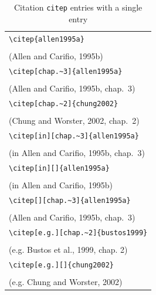 ﻿\documentclass{article}
\begin{document}
\begin{table}
\begin{center}
\begin{tabular}{l}
    \verb#\citep{allen1995a}# \\
    \citep{allen1995a} \\
    (Allen and Carifio, 1995b)\\
\hline
    \verb#\citep[chap.~3]{allen1995a}# \\
    \citep[chap.~3]{allen1995a} \\
    (Allen and Carifio, 1995b, chap.~3)\\
\hline
    \verb#\citep[chap.~2]{chung2002}#\\
    \citep[chap.~2]{chung2002} \\
    (Chung and Worster, 2002, chap.~2)\\
\hline
    \verb#\citep[in][chap.~3]{allen1995a}# \\
    \citep[in][chap.~3]{allen1995a} \\
    (in Allen and Carifio, 1995b, chap.~3)\\
\hline
    \verb#\citep[in][]{allen1995a}# \\
    \citep[in][]{allen1995a} \\
    (in Allen and Carifio, 1995b)\\
\hline
    \verb#\citep[][chap.~3]{allen1995a}# \\
    \citep[][chap.~3]{allen1995a} \\
    (Allen and Carifio, 1995b, chap.~3)\\
\hline
    \verb#\citep[e.g.][chap.~2]{bustos1999}#\\
    \citep[e.g.][chap.~2]{bustos1999} \\
    (e.g. Bustos et al., 1999, chap. 2)\\
\hline
    \verb#\citep[e.g.][]{chung2002}#\\
    \citep[e.g.][]{chung2002} \\
    (e.g. Chung and Worster, 2002)\\
\end{tabular}
\end{center}
\caption{Citation \texttt{citep} entries with a single entry}
\end{table}
\end{document}
